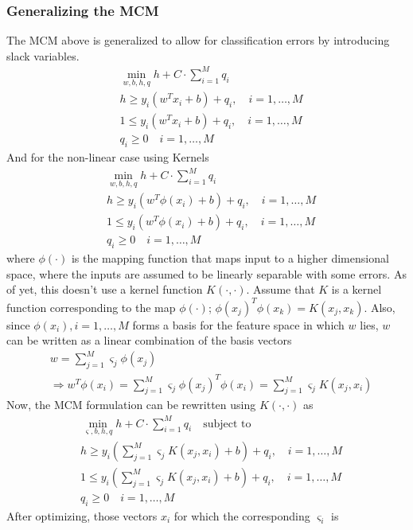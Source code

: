 \documentclass[11pt]{article}
\begin{document}
\subsubsection{Generalizing the MCM}
The MCM above is generalized to allow for classification errors by
introducing slack variables.
\begin{align*}
    &\min_{w,b,h,q}h+C\cdot\sum_{i=1}^Mq_i\\
    &h\ge y_i(w^Tx_i+b)+q_i,\quad i=1,\dotsc,M\\
    &1\le y_i(w^Tx_i+b)+q_i,\quad i=1,\dotsc,M\\
    &q_i\ge 0\quad i=1,\dotsc,M
\end{align*}
And for the non\nobreakdash-linear case using Kernels
\begin{align}
    &\min_{w,b,h,q}h+C\cdot\sum_{i=1}^Mq_i\\
    &h\ge y_i(w^T\phi(x_i)+b)+q_i,\quad i=1,\dotsc,M\\
    &1\le y_i(w^T\phi(x_i)+b)+q_i,\quad i=1,\dotsc,M\\
    &q_i\ge 0\quad i=1,\dotsc,M
\end{align}
where $\phi(\cdot)$ is the mapping function that maps input to a higher
dimensional space, where the inputs are assumed to be linearly separable with
some errors. As of yet, this doesn't use a kernel function $K(\cdot,\cdot)$. Assume that $K$
is a kernel function corresponding to the map $\phi(\cdot)$;
$\phi(x_j)^T\phi(x_k)=K(x_j,x_k)$. Also, since $\phi(x_i), i=1,\dotsc,M$ forms a
basis for the feature space in which $w$ lies, $w$ can be written as a linear
combination of the basis vectors
\begin{align*}
    &w=\sum_{j=1}^M\varsigma_j\phi(x_j)\\
    &\Rightarrow
    w^T\phi(x_i)=\sum_{j=1}^M\varsigma_j\phi(x_j)^T\phi(x_i)=\sum_{j=1}^M\varsigma_jK(x_j,x_i)
\end{align*}
Now, the MCM formulation can be rewritten using $K(\cdot,\cdot)$ as
\begin{align}
    &\label{eq:mcmstart}\min_{\varsigma,b,h,q}h+C\cdot\sum_{i=1}^Mq_i\quad\text{subject to}\\
    &\label{eq:upbound}h\ge y_i\left(\sum_{j=1}^M\varsigma_jK(x_j,x_i)+b\right)+q_i,\quad i=1,\dotsc,M\\
    &1\le y_i\left(\sum_{j=1}^M\varsigma_jK(x_j,x_i)+b\right)+q_i,\quad i=1,\dotsc,M\\
    &\label{eq:mcmend}q_i\ge 0\quad i=1,\dotsc,M
\end{align}
After optimizing, those vectors $x_i$ for which the corresponding $\varsigma_i$ is
\end{document}
